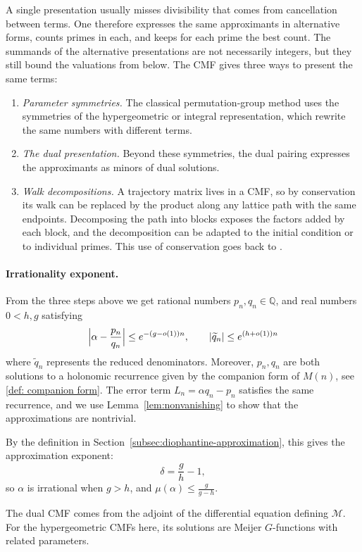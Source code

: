 \documentclass[oneside,english,11pt]{amsart}
\begin{document}
A single presentation usually misses divisibility that comes from cancellation between terms. One therefore expresses the same approximants in alternative forms, counts primes in each, and keeps for each prime the best count. 
The summands of the alternative presentations are
not necessarily integers, but they still bound the valuations from below.
The CMF gives three ways to present the same terms:
\begin{enumerate}
\item \emph{Parameter symmetries.} The classical permutation-group method
\cite{Hata90,rhin1996permutation,rhinViola2001,zudilin2014zeta2} uses the symmetries of the hypergeometric or integral representation, which rewrite the same numbers with different terms.
\item \emph{The dual presentation.} Beyond these symmetries, the dual pairing expresses the approximants as minors of dual solutions.
\item \emph{Walk decompositions.} A trajectory matrix lives in a CMF, so by conservation its walk can be replaced by the product along any lattice path with the same endpoints. Decomposing the path into blocks exposes the factors added by each block, and the decomposition can be adapted to the initial condition or to individual primes. This use of conservation goes back to \cite{David2023CMF}.
\end{enumerate}

\paragraph{Irrationality exponent.}
\label{par: delta}
From the three steps above we get rational numbers $ p_n,q_n\in \mathbb Q$, and real numbers $0<h,g$ satisfying
\[
  \Bigl|\alpha-\frac{p_n}{q_n}\Bigr|\le e^{-(g-o(1))n},
  \qquad
|\widetilde{q}_n|\le e^{(h+o(1))n}
\]
where $\widetilde{q}_n$ represents the reduced denominators.
Moreover, $p_n,q_n$ are both solutions to a holonomic recurrence given by the companion form of $M(n)$, see \ref{def: companion form}. The error term $L_n=\alpha q_n-p_n$ satisfies the same recurrence, and we use Lemma~\ref{lem:nonvanishing} to show that the approximations are nontrivial. 

By the definition in Section~\ref{subsec:diophantine-approximation}, this gives the approximation exponent:
\[
  \delta=\frac gh-1,
\]
so $\alpha$ is irrational when $g>h$, and $\mu(\alpha)\le\frac{g}{g-h}$. 
\begin{remark}\label{rem:finding-dual}
The dual CMF comes from the adjoint of the differential equation defining $\mathcal M$. For the hypergeometric CMFs here, its solutions are Meijer $G$-functions with related parameters.
\end{remark}
\end{document}
